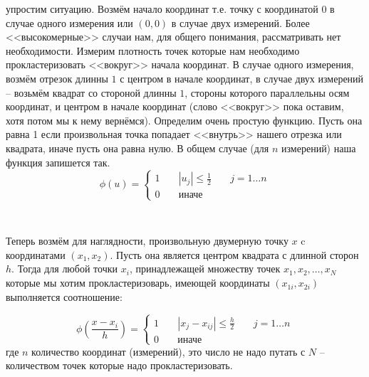 \documentclass[11pt]{article}
\begin{document}
упростим ситуацию. Возмём начало координат т.е. точку с координатой $0$
в случае одного измерения или $(0, 0)$ в случае двух измерений. Более
<<высокомерные>> случаи нам, для общего понимания, рассматривать
нет необходимости. Измерим плотность точек которые нам необходимо
прокластеризовать <<вокруг>> начала координат. В случае одного
измерения, возмём отрезок длинны $1$ с центром в начале координат, в
случае двух измерений -- возьмём квадрат со стороной длинны $1$, стороны
которого параллельны осям координат, и центром в начале координат (слово
<<вокруг>> пока оставим, хотя потом мы к нему вернёмся). Определим
очень простую функцию. Пусть она равна 1 если произвольная точка
попадает <<внутрь>> нашего отрезка или квадрата, иначе пусть она
равна нулю. В общем случае (для $n$ измерений) наша функция запишется
так.
$$
\phi(u) = \left\lbrace
            \begin{aligned}
            1 && \; |u_j| \le \frac{1}{2} && \; j = 1\ldots n \\
            0 && \; \mbox{иначе} &&
           \end{aligned}
          \right.
$$


    \begin{center}
    \end{center}
    { \hspace*{\fill} \\}
    
    Теперь возмём для наглядности, произвольную двумерную
точку $x$ c координатами $(x_1, x_2)$. Пусть она является центром
квадрата с длинной сторон $h$. Тогда для любой точки $x_i$,
принадлежащей множеству точек $x_1, x_2, \ldots , x_N$ которые мы хотим
прокластеризоварь, имеющей координаты $(x_{1i}, x_{2i})$ выполняется
соотношение:

$$
\phi\left(\frac{x - x_i}{h}\right) = \left\lbrace
            \begin{aligned}
            1 && \; |x_j - x_{ij}| \le \frac{h}{2} && \; j = 1\ldots n \\
            0 && \; \mbox{иначе} &&
           \end{aligned}
          \right.
$$
где $n$ количество координат (измерений), это число не надо путать с
$N$ -- количеством точек которые надо прокластеризовать.

    \begin{center}
    \end{center}
    { \hspace*{\fill} \\}
   
\end{document}
